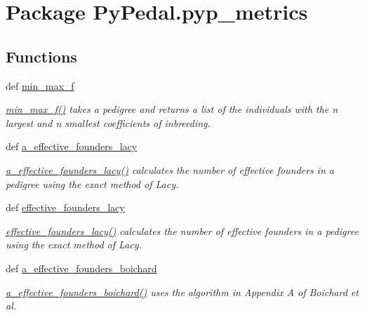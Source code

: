 \hypertarget{namespacePyPedal_1_1pyp__metrics}{
\section{Package Py\-Pedal.pyp\_\-metrics}
\label{namespacePyPedal_1_1pyp__metrics}
}


\subsection*{Functions}
\begin{CompactItemize}
\item 
def \hyperlink{namespacePyPedal_1_1pyp__metrics_f92db7d70e697a1f299c1b01775e9378}{min\_\-max\_\-f}
\begin{CompactList}\small\item\em \hyperlink{namespacePyPedal_1_1pyp__metrics_f92db7d70e697a1f299c1b01775e9378}{min\_\-max\_\-f()} takes a pedigree and returns a list of the individuals with the n largest and n smallest coefficients of inbreeding. \item\end{CompactList}\item 
def \hyperlink{namespacePyPedal_1_1pyp__metrics_3e7338b4892ff4cdedeb907a08114414}{a\_\-effective\_\-founders\_\-lacy}
\begin{CompactList}\small\item\em \hyperlink{namespacePyPedal_1_1pyp__metrics_3e7338b4892ff4cdedeb907a08114414}{a\_\-effective\_\-founders\_\-lacy()} calculates the number of effective founders in a pedigree using the exact method of Lacy. \item\end{CompactList}\item 
def \hyperlink{namespacePyPedal_1_1pyp__metrics_7fd43aa5db477016b9a1cceb7f2eb52d}{effective\_\-founders\_\-lacy}
\begin{CompactList}\small\item\em \hyperlink{namespacePyPedal_1_1pyp__metrics_7fd43aa5db477016b9a1cceb7f2eb52d}{effective\_\-founders\_\-lacy()} calculates the number of effective founders in a pedigree using the exact method of Lacy. \item\end{CompactList}\item 
def \hyperlink{namespacePyPedal_1_1pyp__metrics_2bd174a8cf151ec7b4ed7af7411858b0}{a\_\-effective\_\-founders\_\-boichard}
\begin{CompactList}\small\item\em \hyperlink{namespacePyPedal_1_1pyp__metrics_2bd174a8cf151ec7b4ed7af7411858b0}{a\_\-effective\_\-founders\_\-boichard()} uses the algorithm in Appendix A of Boichard et al. \item\end{CompactList}\item 

\end{CompactItemize}
